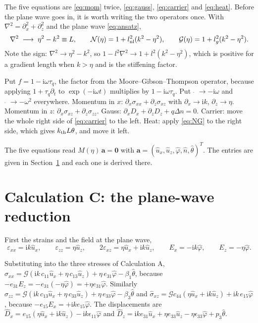 \documentclass[11pt]{article}
\makeatletter
\newif\ifshowworked
\newenvironment{worked}{%
  \ifshowworked\par\smallskip\noindent\textit{Working.}\par\smallskip\else
  \setbox\z@\vbox\bgroup\fi}{\ifshowworked\par\smallskip\else\egroup\fi}
\newcommand{\ii}{\mathrm{i}}
\newcommand{\Ncal}{\mathcal{N}}
\newcommand{\Gcal}{\mathcal{G}}
\makeatother
\begin{document}
The five equations are \eqref{eq:mom} twice, \eqref{eq:gauss}, \eqref{eq:carrier} and \eqref{eq:heat}.
Before the plane wave goes in, it is worth writing the two operators once. With
$\nabla^2=\partial_x^2+\partial_z^2$ and the plane wave \eqref{eq:ansatz},
\begin{equation}
\nabla^2\;\longrightarrow\;\eta^2-k^2\equiv L,\qquad
\Ncal(\eta)=1+l_{\rm nl}^2(k^2-\eta^2),\qquad
\Gcal(\eta)=1+l_g^2(k^2-\eta^2).
\label{eq:NG}
\end{equation}
Note the sign: $\nabla^2\to\eta^2-k^2$, so $1-l^2\nabla^2\to1+l^2(k^2-\eta^2)$, which is positive for a
gradient length when $k>\eta$ and is the stiffening factor.

\begin{worked}
Put $f=1-\ii\omega\tau_q$, the factor from the Moore--Gibson--Thompson operator, because applying
$1+\tau_q\partial_t$ to $\exp(-\ii\omega t)$ multiplies by $1-\ii\omega\tau_q$.
Put $\dot{\;\;}\to-\ii\omega$ and $\ddot{\;\;}\to-\omega^2$ everywhere.
Momentum in $x$: $\partial_x\sigma_{xx}+\partial_z\sigma_{xz}$ with $\partial_x\to\ii k$, $\partial_z\to\eta$.
Momentum in $z$: $\partial_x\sigma_{xz}+\partial_z\sigma_{zz}$.
Gauss: $\partial_xD_x+\partial_zD_z+q\Delta n=0$.
Carrier: move the whole right side of \eqref{eq:carrier} to the left.
Heat: apply \eqref{eq:NG} to the right side, which gives $k_{\rm th}L\theta$, and move it left.
\end{worked}

The five equations read $M(\eta)\,\mathbf a=\mathbf 0$ with
$\mathbf a=(\hat u_x,\hat u_z,\hat\varphi,\hat n,\hat\theta)^{T}$. The entries are given in
Section~\ref{sec:calcC} and each one is derived there.

\section{Calculation C: the plane-wave reduction}\label{sec:calcC}

First the strains and the field at the plane wave,
\begin{equation}
\varepsilon_{xx}=\ii k\hat u_x,\qquad
\varepsilon_{zz}=\eta\hat u_z,\qquad
2\varepsilon_{xz}=\eta\hat u_x+\ii k\hat u_z,\qquad
E_x=-\ii k\hat\varphi,\qquad
E_z=-\eta\hat\varphi .
\end{equation}

\begin{worked}
Substituting into the three stresses of Calculation A,
$\hat\sigma_{xx}=\Gcal(\ii k\,c_{11}\hat u_x+\eta\,c_{13}\hat u_z)+\eta\,e_{31}\hat\varphi-\beta_1\hat\theta$,
because $-e_{31}E_z=-e_{31}(-\eta\hat\varphi)=+\eta e_{31}\hat\varphi$.
Similarly $\hat\sigma_{zz}=\Gcal(\ii k\,c_{13}\hat u_x+\eta\,c_{33}\hat u_z)+\eta\,e_{33}\hat\varphi
-\beta_3\hat\theta$ and
$\hat\sigma_{xz}=\Gcal c_{44}(\eta\hat u_x+\ii k\hat u_z)+\ii k\,e_{15}\hat\varphi$, because
$-e_{15}E_x=+\ii k e_{15}\hat\varphi$.
The displacements are
$\hat D_x=e_{15}(\eta\hat u_x+\ii k\hat u_z)-\ii k\epsilon_{11}\hat\varphi$ and
$\hat D_z=\ii k e_{31}\hat u_x+\eta e_{33}\hat u_z-\eta\epsilon_{33}\hat\varphi+p_3\hat\theta$.
\end{worked}
\end{document}

